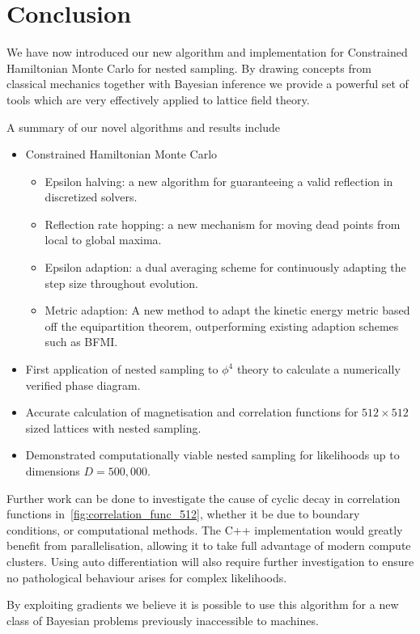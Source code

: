 \documentclass[11pt]{article}
\begin{document}
    \section{Conclusion}\label{sec:conclusion}
    We have now introduced our new algorithm and implementation for Constrained Hamiltonian Monte Carlo for nested sampling.
    By drawing concepts from classical mechanics together with Bayesian inference we provide a powerful
    set of tools which are very effectively applied to lattice field theory.

    A summary of our novel algorithms and results include
    \begin{itemize}
        \item Constrained Hamiltonian Monte Carlo
        \begin{itemize}
            \item Epsilon halving: a new algorithm for guaranteeing a valid reflection in discretized solvers.
            \item Reflection rate hopping: a new mechanism for moving dead points from local to global maxima.
            \item Epsilon adaption: a dual averaging scheme for continuously adapting the step size throughout evolution.
            \item Metric adaption: A new method to adapt the kinetic energy metric based off the equipartition theorem,
            outperforming existing adaption schemes such as BFMI\@.
        \end{itemize}
        \item First application of nested sampling to $\phi^4$ theory to calculate a numerically verified phase diagram.
        \item Accurate calculation of magnetisation and correlation functions for $512 \times 512$ sized lattices with nested sampling.
        \item Demonstrated computationally viable nested sampling for likelihoods up to dimensions $D=500,000$.
    \end{itemize}

    Further work can be done to investigate the cause of cyclic decay in correlation functions
    in~\cref{fig:correlation_func_512}, whether it be due to boundary conditions, or computational methods.
    The C++ implementation would greatly benefit from parallelisation, allowing it to take full advantage of
    modern compute clusters.
    Using auto differentiation will also require further investigation to ensure no pathological behaviour arises for
    complex likelihoods.

    By exploiting gradients we believe it is possible to use this algorithm for a new class of
    Bayesian problems previously inaccessible to machines.
\end{document}
